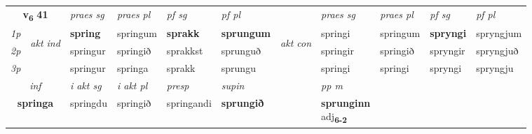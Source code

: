 \noindent
\begin{tabular}{lllllllllll} \toprule
\multicolumn{2}{c}{\textbf{v{\textsubscript{6}}} \Large{\textbf{41}}}  &  \textit{praes sg}  & \textit{praes pl}  &\textit{ pf sg} & \textit{pf pl} &  &  \textit{praes sg}  & \textit{praes pl}  & \textit{pf sg} & \textit{pf pl } \\*
	\cmidrule{3-6} \cmidrule{8-11}
 {\textit{1p}} & \multirow{3}{*}{\begin{turn}{90}\textit{akt ind}\end{turn}} & \textbf{spring} & springum & \textbf{sprakk} & \textbf{sprungum} & \multirow{3}{*}{\begin{turn}{90}\textit{akt con}\end{turn}} &springi & springum & \textbf{spryngi} & spryngjum\\*
 {\textit{2p}} &  &  springur  & springið & sprakkst & sprunguð & & springir & springið & spryngir & spryngjuð \\*
{\textit{3p}} &  & springur & springa & sprakk & sprungu & & springi & springi& spryngi & spryngju \\*
\cmidrule{3-6} \cmidrule{8-11}

   \multicolumn{2}{c}{\textit{inf}}  & \textit{i akt sg} & \textit{i akt pl}   & \textit{presp} & \textit{supin}  && \textit{pp m} \\*
  \multicolumn{2}{c}{\textbf{springa}} & springdu  & springið   & springandi &  \textbf{sprungið}  && \specialcell{\textbf{sprunginn} \\ adj\textbf{\textsubscript{6-2}}} \\*
\end{tabular}

